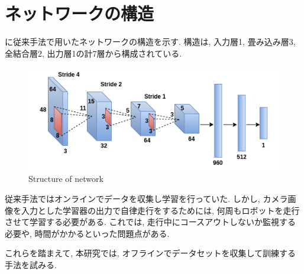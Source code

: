 \newpage
\section{ネットワークの構造}
に従来手法で用いたネットワークの構造を示す. 構造は, 入力層1, 畳み込み層3, 全結合層2, 出力層1の計7層から構成されている.

\begin{figure}[h]
  \centering
  \includegraphics[keepaspectratio, scale=0.6]{images/cnn.png}
  \caption{Structure of network}
  \label{Fig:cnn}
  \end{figure}

\vspace{10mm}
従来手法ではオンラインでデータを収集し学習を行っていた. しかし, カメラ画像を入力とした学習器の出力で自律走行をするためには, 何周もロボットを走行させて学習する必要がある. これでは, 走行中にコースアウトしないか監視する必要や, 時間がかかるといった問題点がある. \par これらを踏まえて, 本研究では, オフラインでデータセットを収集して訓練する手法を試みる. 

